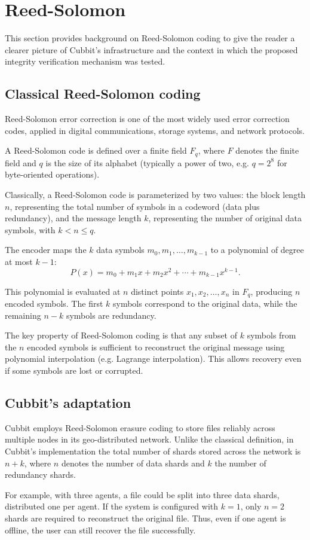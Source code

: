 \section{Reed-Solomon} \label{sec:reed-solomon}

This section provides background on Reed-Solomon coding to give the reader a clearer picture of Cubbit's infrastructure and the context in which the proposed integrity verification mechanism was tested.

\subsection{Classical Reed-Solomon coding}

Reed-Solomon error correction \cite{reed1960polynomial} is one of the most widely used error correction codes, applied in digital communications, storage systems, and network protocols.

A Reed-Solomon code is defined over a finite field $F_q$, where $F$ denotes the finite field and $q$ is the size of its alphabet (typically a power of two, e.g. $q=2^8$ for byte-oriented operations).  

Classically, a Reed-Solomon code is parameterized by two values: the block length $n$, representing the total number of symbols in a codeword (data plus redundancy), and the message length $k$, representing the number of original data symbols, with $k < n \leq q$.

The encoder maps the $k$ data symbols $m_0, m_1, \ldots, m_{k-1}$ to a polynomial of degree at most $k-1$:
\begin{equation}
P(x) = m_0 + m_1x + m_2x^2 + \cdots + m_{k-1}x^{k-1}.
\end{equation}

This polynomial is evaluated at $n$ distinct points $x_1, x_2, \ldots, x_n$ in $F_q$, producing $n$ encoded symbols. The first $k$ symbols correspond to the original data, while the remaining $n-k$ symbols are redundancy.  

The key property of Reed-Solomon coding is that any subset of $k$ symbols from the $n$ encoded symbols is sufficient to reconstruct the original message using polynomial interpolation (e.g. Lagrange interpolation). This allows recovery even if some symbols are lost or corrupted.

\subsection{Cubbit's adaptation} \label{sec:reed-solomon-in-cubbit}

Cubbit employs Reed-Solomon erasure coding to store files reliably across multiple nodes in its geo-distributed network. Unlike the classical definition, in Cubbit's implementation the total number of shards stored across the network is $n+k$, where $n$ denotes the number of data shards and $k$ the number of redundancy shards.

For example, with three agents, a file could be split into three data shards, distributed one per agent. If the system is configured with $k=1$, only $n=2$ shards are required to reconstruct the original file. Thus, even if one agent is offline, the user can still recover the file successfully.  

